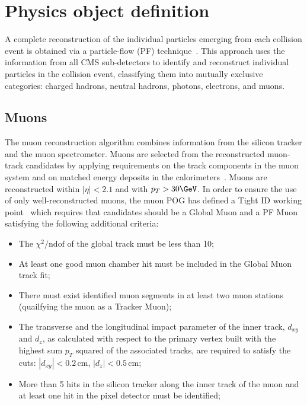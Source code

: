 \section{Physics object definition}
\label{Physics Object Defintion}
A complete reconstruction of the individual particles emerging from 
each collision event is obtained via a particle-flow (PF) 
technique~\cite{CMS-PAS-PFT-09-001, CMS-PAS-PFT-10-002}. This approach 
uses the information from all CMS sub-detectors to identify and reconstruct 
individual particles in the collision event, classifying them into 
mutually exclusive categories: charged hadrons, neutral hadrons, photons, electrons, and muons.

\subsection{Muons}
The muon reconstruction algorithm combines information from the 
silicon tracker and the muon spectrometer. Muons are selected 
from the reconstructed muon-track candidates by applying requirements
on the track components in the muon system and on matched energy 
deposits in the calorimeters~\cite{CMS-PAS-PFT-10-003}. 
Muons are reconstructed within $|\eta| < 2.1$ and with $p_{T} > 30\GeV$.
In order to ensure the use of only well-reconstructed muons, the muon 
POG has defined a Tight ID working point~\cite{MUONPAS} which 
requires that candidates should be a Global Muon and a PF Muon 
satisfying the following additional criteria: 

\begin{itemize}
\item The $\chi^{2}/\mathrm{ndof}$ of the global track must be less than 10;
\item At least one good muon chamber hit must be included in the Global Muon track fit;
\item There must exist identified muon segments in at least two muon stations (quailfying the muon as a Tracker Muon);
\item The transverse and the longitudinal impact parameter of the inner track, $d_{xy}$ and $d_z$, as calculated with respect to the primary vertex  built with the highest sum $p_{T}$ squared of the associated tracks, are required to satisfy the cuts: $|d_{xy}|< 0.2 \, \mathrm{cm}$, $|d_{z}| < 0.5 \, \mathrm{cm}$;
\item More than 5 hits in the silicon tracker along the inner track of the muon and at least one hit in the pixel detector must be identified;
\end{itemize}

